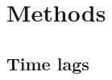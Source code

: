 \documentclass[main.tex]{subfiles}
\begin{document}
\part{Methods}

\chapter{Time lags}










\end{document}
